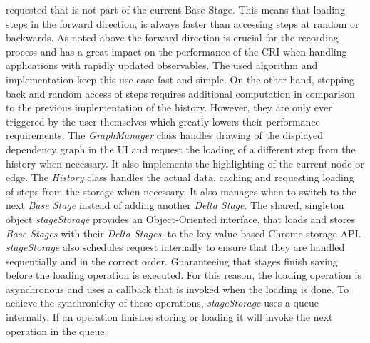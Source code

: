 requested that is not part of the current Base Stage. This means that loading steps in the forward direction, is always faster than accessing steps at random or backwards. As noted above the forward direction is crucial for the recording process and has a great impact on the performance of the CRI when handling applications with rapidly updated observables. The used algorithm and implementation keep this use case fast and simple. On the other hand, stepping back and random access of steps requires additional computation in comparison to the previous implementation of the history. However, they are only ever triggered by the user themselves which greatly lowers their performance requirements.
The \emph{GraphManager} class handles drawing of the displayed dependency graph in the UI and request the loading of a different step from the history when necessary. It also implements the highlighting of the current node or edge. The \emph{History} class handles the actual data, caching and requesting loading of steps from the storage when necessary. It also manages when to switch to the next \emph{Base Stage} instead of adding another \emph{Delta Stage}. The shared, singleton object \emph{stageStorage} provides an Object-Oriented interface, that loads and stores \emph{Base Stages} with their \emph{Delta Stages}, to the key-value based Chrome storage API. \emph{stageStorage} also schedules request internally to ensure that they are handled sequentially and in the correct order. Guaranteeing that stages finish saving before the loading operation is executed. For this reason, the loading operation is asynchronous and uses a callback that is invoked when the loading is done. To achieve the synchronicity of these operations, \emph{stageStorage} uses a queue internally. If an operation finishes storing or loading it will invoke the next operation in the queue.	
	
